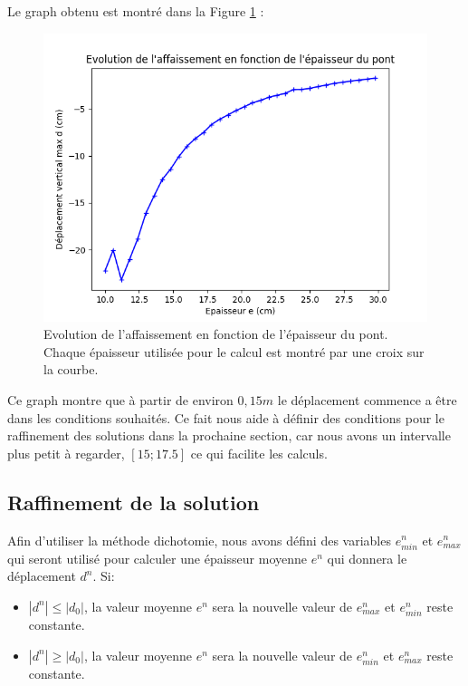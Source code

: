 \documentclass{article}
\begin{document}
    Le graph obtenu est montré dans la Figure \ref{fig:graph} :
    \begin{figure}[H]        
    \begin{center}
	
        \includegraphics[width=12cm]{imgs/graph.png}
        \caption{Evolution de l'affaissement en fonction de l'épaisseur du pont. Chaque épaisseur utilisée pour le calcul est montré par une croix sur la courbe.}
        \label{fig:graph}
    
	\end{center}
    \end{figure}
    Ce graph montre que à partir de environ $0,15 m$ le déplacement commence a être dans les conditions souhaités. Ce fait nous aide à définir des conditions pour le raffinement des solutions dans la prochaine section, car nous avons un intervalle plus petit à regarder, $[15; 17.5]$ ce qui facilite les calculs.
    \subsection{Raffinement de la solution}
    
    Afin d'utiliser la méthode dichotomie, nous avons défini des variables $e^n_{min}$ et $e^n_{max}$  qui seront utilisé pour calculer une épaisseur moyenne $e^n$ 	qui donnera le déplacement $d^n$. Si:
    
    \begin{itemize}
    \item $|d^n| \le |d_0|$, la valeur moyenne $e^n$ sera la nouvelle valeur de $e^n_{max}$ et $e^n_{min}$ reste constante.
    \item $|d^n| \ge |d_0|$, la valeur moyenne $e^n$ sera la nouvelle valeur de $e^n_{min}$ et $e^n_{max}$ reste constante.
    \end{itemize}
   
\end{document}

